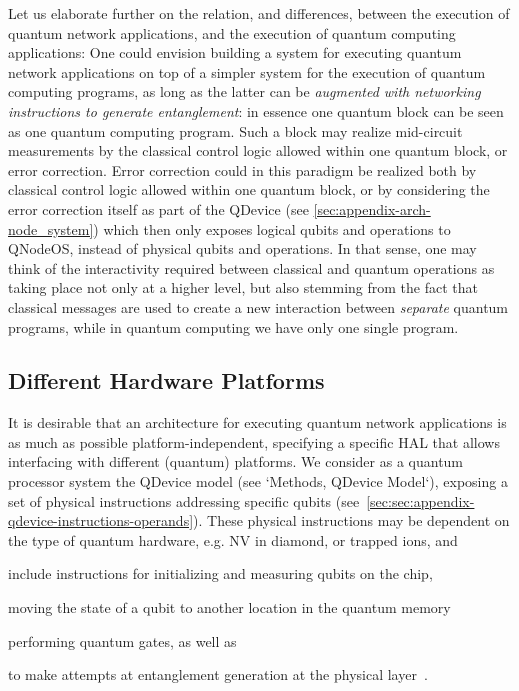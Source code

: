 Let us elaborate further on the relation, and differences, between the execution of quantum network applications, and the execution of quantum computing applications: One could envision building a system for executing quantum network applications on top of a simpler system for the execution of quantum computing programs, as long as the latter can be \emph{augmented with networking instructions to generate entanglement}: in essence one quantum block can be seen as one quantum computing program. Such a block may realize mid-circuit measurements by the classical control logic allowed within one quantum block, or error correction. Error correction could in this paradigm be realized both by classical control logic allowed within one quantum block, or by considering the error correction itself as part of the \ac{QDevice} (see \cref{sec:appendix-arch-node_system}) which then only exposes logical qubits and operations to \ac{QNodeOS}, instead of physical qubits and operations. In that sense, one may think of the interactivity required between classical and quantum operations as taking place not only at a higher level, but also stemming from the fact that classical messages are used to create a new interaction between \emph{separate} quantum programs, while in quantum computing we have only one single program.

\subsection{Different Hardware Platforms} 

It is desirable that an architecture for executing quantum network applications is as much as possible platform-independent, specifying a specific \ac{HAL} that allows interfacing with different (quantum) platforms. We consider as a quantum processor system the \ac{QDevice} model (see `Methods, QDevice Model`), exposing a set of physical instructions addressing specific qubits (see~\cref{sec:sec:appendix-qdevice-instructions-operands}). These physical instructions may be dependent on the type of quantum hardware, e.g. NV in diamond, or trapped ions, and
%
\begin{inlinelist}
\item include instructions for initializing and measuring qubits on the chip,
\item moving the state of a qubit to another location in the quantum memory
\item performing quantum gates, as well as
\item to make attempts at entanglement generation at the physical layer~\cite{pompili_2022_experimental}.
\end{inlinelist}

